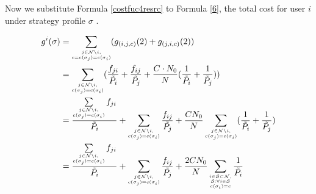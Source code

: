 \documentclass[times]{ettauth}
\theoremstyle{mytheoremstyle}
\theoremstyle{mytheoremstyle}
\theoremstyle{mytheoremstyle}
\begin{document}
Now we substitute Formula \ref{costfuc4resrc} to Formula \ref{6}, the total cost for user $i$ under strategy profile $\sigma$ . 

\begin{equation}
\label{cost1player}
\begin{split}
g^i(\sigma)
& = \sum_{\tiny\substack{j\in \mathcal{N}\setminus i,\\ c=c(\sigma_j)=c(\sigma_i)}} (g_{(i,j,c)}(2) + g_{(j,i,c)}(2))\\
& = \sum_{\tiny\substack{j\in \mathcal{N}\setminus i,\\ c(\sigma_j)=c(\sigma_i)}}(\dfrac{f_{ji}}{\tilde{P_i}} + \dfrac{f_{ij}}{\tilde{P_j}}+ \dfrac{C\cdot N_0}{N}(\dfrac{1}{\tilde P_i}+\dfrac{1}{\tilde P_j})) \\
& = \dfrac{\sum\limits_{\tiny\substack{j\in \mathcal{N}\setminus i,\\ c(\sigma_j)=c(\sigma_i)}}f_{ji}}{ \tilde{P_i}} + \sum_{\tiny\substack{j\in \mathcal{N}\setminus i, \\c(\sigma_j)=c(\sigma_i)}}\dfrac{f_{ij}}{\tilde{P_j}} + \dfrac{CN_0}{N}\sum_{\tiny\substack{j\in \mathcal{N}\setminus i,\\ c(\sigma_j)=c(\sigma_i)}}(\dfrac{1}{\tilde{P_i}}+\dfrac{1}{\tilde{P_j}})\\
& = \dfrac{\sum\limits_{\tiny\substack{j\in \mathcal{N}\setminus i,\\ c(\sigma_j)=c(\sigma_i)}}f_{ji}}{ \tilde{P_i}} + \sum_{\tiny\substack{j\in \mathcal{N}\setminus i,\\ c(\sigma_j)=c(\sigma_i)}}\dfrac{f_{ij}}{\tilde{P_j}} + \dfrac{2CN_0}{N}\sum_{\tiny\substack{i\in\mathcal{S}\subset\mathcal{N},\\\mathcal{S}:\forall i\in \mathcal{S}\\ c(\sigma_i)=c}}\dfrac{1}{\tilde{P_i}}\\
\end{split}
\end{equation}
\end{document}
